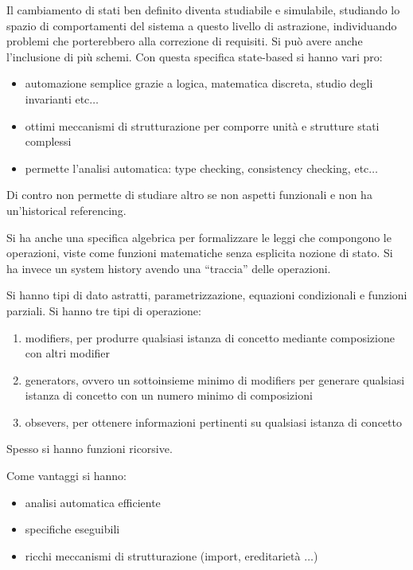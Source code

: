Il cambiamento di stati ben definito diventa studiabile e simulabile, studiando
lo spazio di comportamenti del sistema a questo livello di astrazione, individuando
problemi che porterebbero alla correzione di requisiti. Si può avere anche
l'inclusione di più schemi. Con questa specifica state-based si hanno vari pro:
\begin{itemize}
    \item automazione semplice grazie a logica, matematica discreta, studio degli
          invarianti etc$\dots$
    \item ottimi meccanismi di strutturazione per comporre unità e strutture
          stati complessi
    \item permette l'analisi automatica: type checking, consistency checking,
          etc$\dots$
\end{itemize}

Di contro non permette di studiare altro se non aspetti funzionali e non ha
un'historical referencing.

Si ha anche una specifica algebrica per formalizzare le leggi che compongono le
operazioni, viste come funzioni matematiche senza esplicita nozione di stato.
Si ha invece un system history avendo una “traccia” delle operazioni.

Si hanno tipi di dato astratti, parametrizzazione, equazioni condizionali e funzioni
parziali. Si hanno tre tipi di operazione:
\begin{enumerate}
    \item modifiers, per produrre qualsiasi istanza di concetto mediante composizione
          con altri modifier
    \item generators, ovvero un sottoinsieme minimo di modifiers per generare
          qualsiasi istanza di concetto con un numero minimo di composizioni
    \item obsevers, per ottenere informazioni pertinenti su qualsiasi istanza di
          concetto
\end{enumerate}

Spesso si hanno funzioni ricorsive.

Come vantaggi si hanno:
\begin{itemize}
    \item analisi automatica efficiente
    \item specifiche eseguibili
    \item ricchi meccanismi di strutturazione (import, ereditarietà $\dots$)
\end{itemize}

